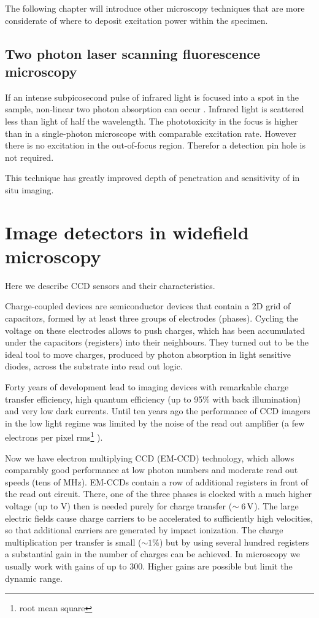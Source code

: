 The following chapter will introduce other microscopy techniques that
are more considerate of where to deposit excitation power within the
specimen.
\subsection{Two photon laser scanning fluorescence microscopy}
If an intense subpicosecond pulse of infrared light is focused into a
spot in the sample, non-linear two photon absorption can occur
\citep{Denk1990}. Infrared light is scattered less than light of half
the wavelength. The phototoxicity in the focus is higher than in a
single-photon microscope with comparable excitation rate. However
there is no excitation in the out-of-focus region. Therefor a
detection pin hole is not required.

This technique has greatly improved depth of penetration and
sensitivity of in situ imaging. %
\section{Image detectors in widefield microscopy}
\label{sec:ccd-intro}
\begin{summary}
  Here we describe CCD
  sensors and their characteristics.
\end{summary}
Charge-coupled devices are semiconductor devices that contain a 2D
grid of capacitors, formed by at least three groups of electrodes
(phases). Cycling the voltage on these electrodes allows to push
charges, which has been accumulated under the capacitors (registers)
into their neighbours. They turned out to be the ideal tool to move
charges, produced by photon absorption in light sensitive diodes,
across the substrate into read out logic.

Forty years of development lead to imaging devices with remarkable
charge transfer efficiency, high quantum efficiency (up to 95\% with
back illumination) and very low dark currents. Until ten years ago the
performance of CCD imagers in the low light regime was limited by the
noise of the read out amplifier (a few electrons per pixel
rms\footnote{root mean square} ).

Now we have electron multiplying CCD (EM-CCD)
 technology,
which allows comparably good performance at low photon numbers
\citep{Mackay,Robbins2003} and moderate read out speeds (tens of
MHz). EM-CCDs contain a row of additional registers in front of the
read out circuit. There, one of the three phases is clocked with a
much higher voltage (up to \unit[40]{V}) then is needed purely for
charge transfer ($\unit[\sim6]{V}$). The large electric fields cause
charge carriers to be accelerated to sufficiently high velocities, so
that additional carriers are generated by impact ionization. The
charge multiplication per transfer is small ($\sim1\%$) but by using
several hundred registers a substantial gain in the number of charges
can be achieved. In microscopy we usually work with gains of up to
300. Higher gains are possible but limit the dynamic range.

